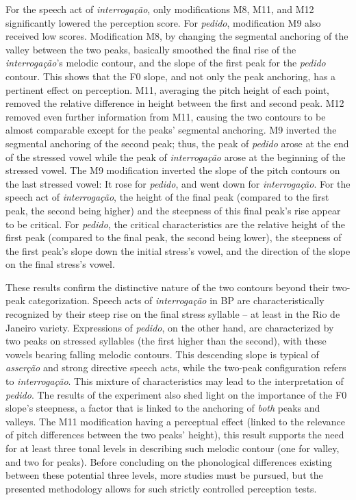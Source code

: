 \documentclass[output=paper]{LSP/langsci}
\begin{document}
For the speech act of \textit{interrogação}, only modifications M8, M11, and M12 significantly lowered the perception score. 
For \textit{pedido}, modification M9 also received low scores. 
Modification M8, by changing the segmental anchoring of the valley between the two peaks, basically smoothed the final rise of the \textit{interrogação}'s melodic contour, and the slope of the first peak for the \textit{pedido} contour. 
This shows that the F0 slope, and not only the peak anchoring, has a pertinent effect on perception.
M11, averaging the pitch height of each point, removed the relative difference in height between the first and second peak. 
M12 removed even further information from M11, causing the two contours to be almost comparable except for the peaks' segmental anchoring. 
M9 inverted the segmental anchoring of the second peak; thus, the peak of \textit{pedido} arose at the end of the stressed vowel while the peak of \textit{interrogação} arose at the beginning of the stressed vowel. 
The M9 modification inverted the slope of the pitch contours on the last stressed vowel: It rose for \textit{pedido}, and went down for \textit{interrogação}. 
For the speech act of \textit{interrogação}, the height of the final peak (compared to the first peak, the second being higher) and the steepness of this final peak's rise appear to be critical. 
For \textit{pedido}, the critical characteristics are the relative height of the first peak (compared to the final peak, the second being lower), the steepness of the first peak's slope down the initial stress's vowel, and the direction of the slope on the final stress's vowel. 

These results confirm the distinctive nature of the two contours beyond their two-peak categorization. 
Speech acts of \textit{interrogação} in BP are characteristically recognized by their steep rise on the final stress syllable -- at least in the Rio de Janeiro variety. 
Expressions of \textit{pedido}, on the other hand, are characterized by two peaks on stressed syllables (the first higher than the second), with these vowels bearing falling melodic contours. 
This descending slope is typical of \textit{asserção} and strong directive speech acts, while the two-peak configuration refers to \textit{interrogação}.
This mixture of characteristics may lead to the interpretation of \textit{pedido}.
The results of the experiment also shed light on the importance of the F0 slope's steepness, a factor that is linked to the anchoring of \textit{both} peaks and valleys.
The M11 modification having a perceptual effect (linked to the relevance of pitch differences between the two peaks' height), this result supports the need for at least three tonal levels in describing such melodic contour (one for valley, and two for peaks).
Before concluding on the phonological differences existing between these potential three levels, more studies must be pursued, but the presented methodology allows for such strictly controlled perception tests.
\end{document}
